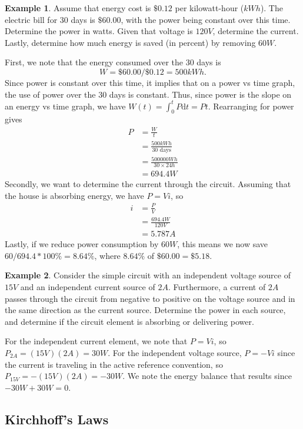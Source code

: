 \documentclass[11pt]{article}
\theoremstyle{plain} %
\theoremstyle{definition}
\theoremstyle{example}
\newtheorem*{example}{Example}
\theoremstyle{remark}
\begin{document}
\begin{example}
Assume that energy cost is $\$0.12$ per kilowatt-hour ($kWh$). The electric bill for 30 days is $\$60.00$, with the power being constant over this time. Determine the power in watts. Given that voltage is $120V$, determine the current. Lastly, determine how much energy is saved (in percent) by removing $60W$. 
\end{example}
First, we note that the energy consumed over the 30 days is 
$$W = \$60.00/\$0.12 = 500kWh.$$
Since power is constant over this time, it implies that on a power vs time graph, the use of power over the 30 days is constant. Thus, since power is the slope on an energy vs time graph, we have $W(t) = \int_0^t P\mathrm d t = Pt$. Rearranging for power gives
\begin{align*}
	P &= \frac{W}{t} \\
	&= \frac{500kWh}{30 \text{ days}} \\
	&= \frac{500000Wh}{30\times24h}\\
	&= 694.4W
\end{align*}
Secondly, we want to determine the current through the circuit. Assuming that the house is absorbing energy, we have $P = Vi$, so 
\begin{align*}
	i &=\frac{P}{V} \\
	&= \frac{694.4W}{120V} \\
	&= 5.787A
\end{align*}
Lastly, if we reduce power consumption by $60W$, this means we now save $60/694.4*100\% = 8.64\%$, where $8.64\%$ of $\$60.00 = \$5.18$.

\begin{example}
Consider the simple circuit with an independent voltage source of $15V$ and an independent current source of $2A$. Furthermore, a current of $2A$ passes through the circuit from negative to positive on the voltage source and in the same direction as the current source. Determine the power in each source, and determine if the circuit element is absorbing or delivering power. 
\end{example}

For the independent current element, we note that $P = Vi$, so $P_{2A} = (15V)(2A) = 30W$. For the independent voltage source, $P =-Vi$ since the current is traveling in the active reference convention, so $P_{15V} = -(15V)(2A) = -30W$. We note the energy balance that results since $-30W + 30W = 0$. 

\subsection{Kirchhoff's Laws}
\end{document}
